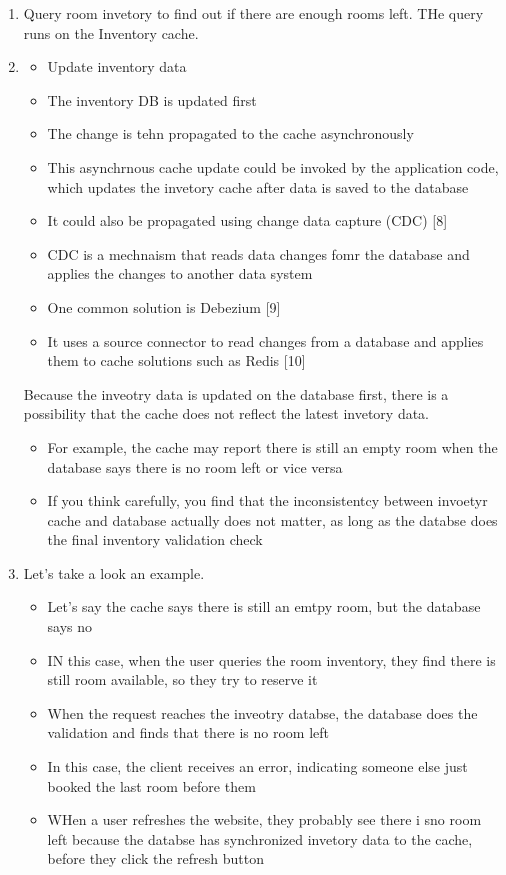 \documentclass{report}
\theoremstyle{definition}
\begin{document}
\begin{enumerate}
\item

Query room invetory to find out if there are enough rooms left. THe query runs on the Inventory cache.

\item

\begin{itemize}
\item
Update inventory data
\item
The inventory DB is updated first
\item
The change is tehn propagated to the cache asynchronously
\item
This asynchrnous cache update could be invoked by the application code, which updates the invetory cache after data is saved to the database
\item
It could also be propagated using change data capture (CDC) [8]
\item
CDC is a mechnaism that reads data changes fomr the database and applies the changes to another data system
\item
One common solution is Debezium [9]
\item
It uses a source connector to read changes from a database and applies them to cache solutions such as Redis [10]
\end{itemize}


Because the inveotry data is updated on the database first, there is a possibility that the cache does not reflect the latest invetory data.

\begin{itemize}
\item
For example, the cache may report there is still an empty room when the database says there is no room left or vice versa
\item
If you think carefully, you find that the inconsistentcy between invoetyr cache and database actually  does not matter, as long as the databse does the final inventory validation check
\end{itemize}

\item
Let's take a look an example.

\begin{itemize}
\item
Let's say the cache says there is still an emtpy room, but the database says no
\item
IN this case, when the user queries the room inventory, they find there is still room available, so they try to reserve it
\item
When the request reaches the inveotry databse, the database does the validation and finds that there is no room left
\item
In this case, the client receives an error, indicating someone else just booked the last room before them
\item
WHen a user refreshes the website, they probably see there i sno room left because the databse has synchronized invetory data to the cache, before they click the refresh button
\end{itemize}
\end{enumerate}
\end{document}
